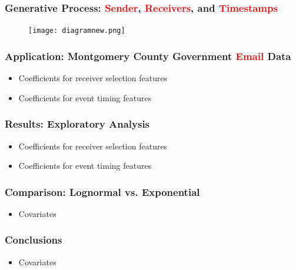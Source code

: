 \documentclass{beamer}
\begin{document}
	\begin{frame}
		\frametitle{Generative Process: \textcolor{red}{Sender}, \textcolor{red}{Receivers}, and \textcolor{red}{Timestamps}}
					\begin{figure}[H]
						\centering
						\texttt{[image: diagramnew.png]}	
						\label{figure:diagram}
					\end{figure}						
			\end{frame}
			
				\begin{frame}
			\frametitle{Application: Montgomery County Government
\textcolor{red}{Email} Data}
\begin{itemize}
				\item Coefficients for receiver selection features
			\item Coefficients for event timing features
			\end{itemize}
		\end{frame}				
		\begin{frame}
			\frametitle{Results: Exploratory Analysis}
			\begin{itemize}
				\item Coefficients for receiver selection features
				\item Coefficients for event timing features
			\end{itemize}
			
		\end{frame}				
				\begin{frame}
					\frametitle{Comparison: Lognormal vs. Exponential}
					\begin{itemize}
						\item Covariates
					\end{itemize}
				\end{frame}	
							\begin{frame}
								\frametitle{Conclusions}
								\begin{itemize}
									\item Covariates
								\end{itemize}
							\end{frame}	
							
\end{document}
